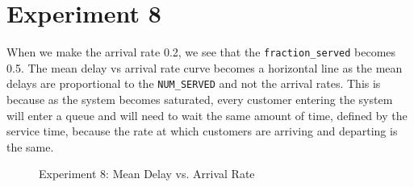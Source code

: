 \section*{Experiment 8}
When we make the arrival rate 0.2, we see that the \texttt{fraction\_served} becomes 0.5. The mean delay vs arrival rate curve becomes a horizontal line as the mean delays are proportional to the \texttt{NUM\_SERVED} and not the arrival rates.
This is because as the system becomes saturated, every customer entering the system will enter a queue and will need to wait the same amount of time, defined by the service time, because the rate at which customers are arriving and departing is the same.

\begin{figure}[htp]
\centering
{}
\caption{Experiment 8: Mean Delay vs. Arrival Rate}
\label{fig:exp8}
\end{figure}